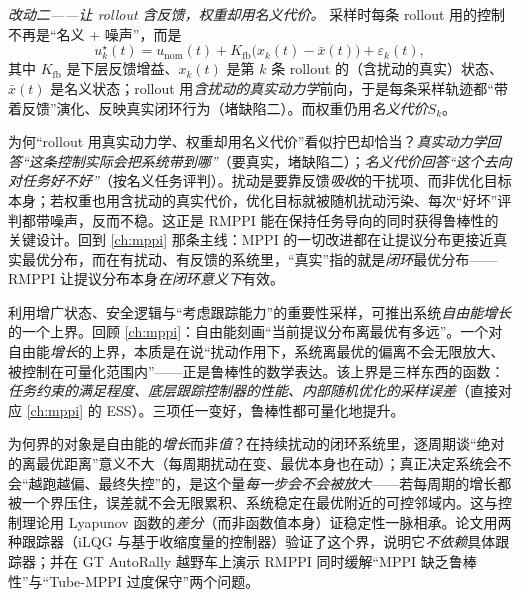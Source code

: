 \emph{改动二——让 rollout 含反馈，权重却用名义代价。} 采样时每条 rollout 用的控制不再是“名义 $+$ 噪声”，而是
\begin{equation}
  u^\star_k(t)=u_{\text{nom}}(t)+K_{\text{fb}}\big(x_k(t)-\bar{x}(t)\big)+\varepsilon_k(t),
  \label{eq:mv-rmppi-rollout}
\end{equation}
其中 $K_{\text{fb}}$ 是下层反馈增益、$x_k(t)$ 是第 $k$ 条 rollout 的（含扰动的真实）状态、$\bar x(t)$ 是名义状态；rollout 用\emph{含扰动的真实动力学}前向，于是每条采样轨迹都“带着反馈”演化、反映真实闭环行为（堵缺陷二）。而权重仍用\emph{名义代价}$S_k$。

\begin{insight}
为何“rollout 用真实动力学、权重却用名义代价”看似拧巴却恰当？\emph{真实动力学回答“这条控制实际会把系统带到哪”}（要真实，堵缺陷二）；\emph{名义代价回答“这个去向对任务好不好”}（按名义任务评判）。扰动是要靠反馈\emph{吸收}的干扰项、而非优化目标本身；若权重也用含扰动的真实代价，优化目标就被随机扰动污染、每次“好坏”评判都带噪声，反而不稳。这正是 RMPPI 能在保持任务导向的同时获得鲁棒性的关键设计。回到 \cref{ch:mppi} 那条主线：MPPI 的一切改进都在让提议分布更接近真实最优分布，而在有扰动、有反馈的系统里，“真实”指的就是\emph{闭环}最优分布——RMPPI 让提议分布本身\emph{在闭环意义下}有效。
\end{insight}

\begin{theorem}\label{thm:mv-freenergy}
利用增广状态、安全逻辑与“考虑跟踪能力”的重要性采样，可推出系统\emph{自由能增长}的一个上界\cite{gandhi2021robust}。回顾 \cref{ch:mppi}：自由能刻画“当前提议分布离最优有多远”。一个对自由能\emph{增长}的上界，本质是在说“扰动作用下，系统离最优的偏离不会无限放大、被控制在可量化范围内”——正是鲁棒性的数学表达。该上界是三样东西的函数：\emph{任务约束的满足程度、底层跟踪控制器的性能、内部随机优化的采样误差}（直接对应 \cref{ch:mppi} 的 ESS）。三项任一变好，鲁棒性都可量化地提升。
\end{theorem}

\noindent 为何界的对象是自由能的\emph{增长}而非\emph{值}？在持续扰动的闭环系统里，逐周期谈“绝对的离最优距离”意义不大（每周期扰动在变、最优本身也在动）；真正决定系统会不会“越跑越偏、最终失控”的，是这个量\emph{每一步会不会被放大}——若每周期的增长都被一个界压住，误差就不会无限累积、系统稳定在最优附近的可控邻域内。这与控制理论用 Lyapunov 函数的\emph{差分}（而非函数值本身）证稳定性一脉相承。论文用两种跟踪器（iLQG 与基于收缩度量的控制器）验证了这个界，说明它\emph{不依赖}具体跟踪器；并在 GT AutoRally 越野车上演示 RMPPI 同时缓解“MPPI 缺乏鲁棒性”与“Tube-MPPI 过度保守”两个问题\cite{gandhi2021robust}。

